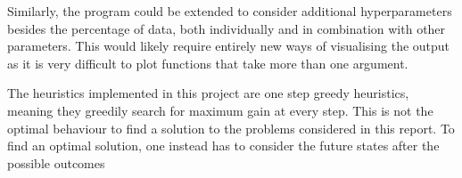 \documentclass[a4paper,12pt,twoside,openright]{report}
\begin{document}
Similarly, the program could be extended to consider additional hyperparameters besides the percentage of data, both individually and in combination with other parameters. This would likely require entirely new ways of visualising the output as it is very difficult to plot functions that take more than one argument.

The heuristics implemented in this project are one step greedy heuristics, meaning they greedily search for maximum gain at every step. This is not the optimal behaviour to find a solution to the problems considered in this report. To find an optimal solution, one instead has to consider the future states after the possible outcomes 




 



\appendix
\singlespacing


 

\end{document}
